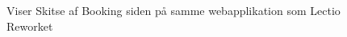         \begin{figure}[H]
            \centering
            \caption{Viser Skitse af Booking siden på samme webapplikation som Lectio Reworket}
        \end{figure}

